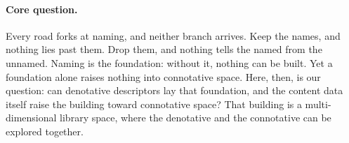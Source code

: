 \paragraph{Core question.}
Every road forks at naming, and neither branch arrives. Keep the names, and
nothing lies past them. Drop them, and nothing tells the named from the unnamed.
Naming is the foundation: without it, nothing can be built. Yet a foundation
alone raises nothing into connotative space. Here, then, is our question: can
denotative descriptors lay that foundation, and the content data itself raise
the building toward connotative space? That building is a multi-dimensional
library space, where the denotative and the connotative can be explored
together.